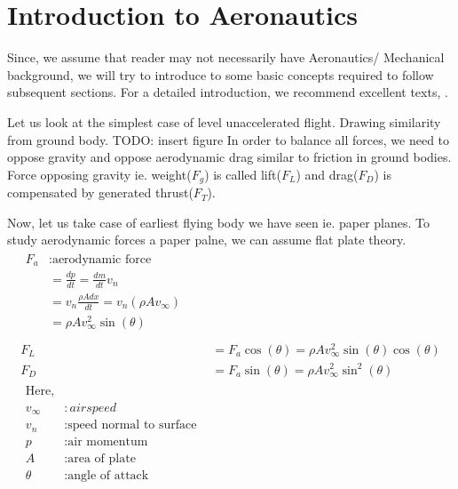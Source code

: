 \section{Introduction to Aeronautics}
Since, we assume that reader may not necessarily have Aeronautics/ Mechanical background, we will try to introduce to some basic concepts required to follow subsequent sections. For a detailed introduction, we recommend excellent texts\cite{anderson2005introduction}, \cite{anderson1999aircraft}.

Let us look at the simplest case of level unaccelerated flight. Drawing similarity from ground body.
TODO: insert figure
In order to balance all forces, we need to oppose gravity and oppose aerodynamic drag similar to friction in ground bodies. Force opposing gravity ie. weight($F_g$) is called lift($F_L$) and drag($F_D$) is compensated by generated thrust($F_T$).

Now, let us take case of earliest flying body we have seen ie. paper planes. To study aerodynamic forces a paper palne, we can assume flat plate theory\cite{tangler2005wind}.
\begin{align}
    \begin{split}
        \nonumber
        F_a &: \text{aerodynamic force} \\
        &= \frac{dp}{dt} = \frac{dm}{dt} v_n  \\
        &= v_n \frac{\rho A dx}{dt} = v_n (\rho A v_\infty) \\
        &= \rho A v_\infty^2 \sin(\theta) \\
    \end{split}\\
        \label{eq:flat_lift}
        F_L &= F_a \cos(\theta) = \rho A v_\infty^2 \sin(\theta) \cos(\theta)\\
        \label{eq:flat_drag}
        F_D &= F_a \sin(\theta) = \rho A v_\infty^2 \sin^2(\theta)\\        
    \begin{split}
        \nonumber
        \text{Here},\\
        v_\infty &: airspeed\\
        v_n&: \text{speed normal to surface}\\
        p&:\text{air momentum}\\
        A&:\text{area of plate}\\
        \theta&:\text{angle of attack}\\    
    \end{split}
\end{align}

